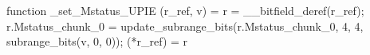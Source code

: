 function _set_Mstatus_UPIE (r_ref, v) = {
    r = __bitfield_deref(r_ref);
    r.Mstatus_chunk_0 = update_subrange_bits(r.Mstatus_chunk_0, 4, 4, subrange_bits(v, 0, 0));
    (*r_ref) = r
}
